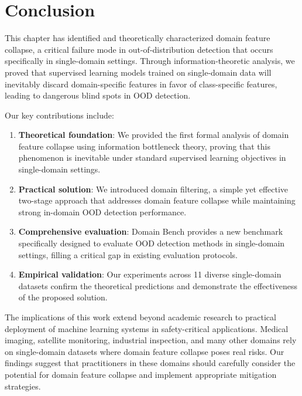 \documentclass[11pt, oneside]{book}
\theoremstyle{plain}
\theoremstyle{definition}
\theoremstyle{remark}
\begin{document}
\section{Conclusion}

This chapter has identified and theoretically characterized domain feature collapse, a critical failure mode in out-of-distribution detection that occurs specifically in single-domain settings. Through information-theoretic analysis, we proved that supervised learning models trained on single-domain data will inevitably discard domain-specific features in favor of class-specific features, leading to dangerous blind spots in OOD detection.

Our key contributions include:

\begin{enumerate}
\item \textbf{Theoretical foundation}: We provided the first formal analysis of domain feature collapse using information bottleneck theory, proving that this phenomenon is inevitable under standard supervised learning objectives in single-domain settings.

\item \textbf{Practical solution}: We introduced domain filtering, a simple yet effective two-stage approach that addresses domain feature collapse while maintaining strong in-domain OOD detection performance.

\item \textbf{Comprehensive evaluation}: Domain Bench provides a new benchmark specifically designed to evaluate OOD detection methods in single-domain settings, filling a critical gap in existing evaluation protocols.

\item \textbf{Empirical validation}: Our experiments across 11 diverse single-domain datasets confirm the theoretical predictions and demonstrate the effectiveness of the proposed solution.
\end{enumerate}

The implications of this work extend beyond academic research to practical deployment of machine learning systems in safety-critical applications. Medical imaging, satellite monitoring, industrial inspection, and many other domains rely on single-domain datasets where domain feature collapse poses real risks. Our findings suggest that practitioners in these domains should carefully consider the potential for domain feature collapse and implement appropriate mitigation strategies.
\end{document}
